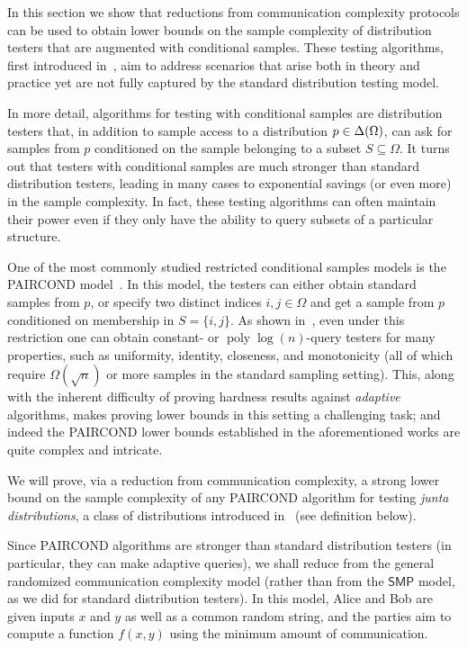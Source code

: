 \documentclass[11pt]{article}
\theoremstyle{remark}   	\newtheorem{remark}[theorem]{Remark}
\theoremstyle{definition}   	\newaliascnt{defn}{theorem}
\providecommand{\poly}{\operatorname*{poly}}
\newcommand{\PCOND}{{\sf PAIRCOND}\xspace}
\newcommand{\SMP}{\ensuremath{\mathsf{SMP}}}
\begin{document}
In this section we show that reductions from communication complexity protocols can be used to obtain lower bounds on the sample complexity of distribution testers that are augmented with conditional samples. These testing algorithms, first introduced in~\cite{CFGM:13,CRS:12}, aim to address scenarios that arise both in theory and practice yet are not fully captured by the standard distribution testing model.

In more detail, algorithms for testing with conditional samples are distribution testers that, in addition to sample access to a distribution $p\in\Delta\!\left(\Omega\right)$, can ask for samples from $p$ conditioned on the sample belonging to a subset $S \subseteq \Omega$. It turns out that testers with conditional samples are much stronger than standard distribution testers, leading in many cases to exponential savings (or even more) in the sample complexity. In fact, these testing algorithms can often maintain their power even if they only have the ability to query subsets of a particular structure. 

One of the most commonly studied restricted conditional samples models is the \PCOND model~\cite{CRS:12}. In this model, the testers can either obtain standard samples from $p$, or specify two distinct indices $i,j \in \Omega$ and get a sample from $p$ conditioned on membership in $S=\{i,j\}$. As shown in~\cite{CRS:12,Canonne:15:Survey}, even under this restriction one can obtain constant- or $\poly\log(n)$-query testers for many properties, such as uniformity, identity, closeness, and monotonicity (all of which require $\Omega(\sqrt{n})$ or more samples in the standard sampling setting). This, along with the inherent difficulty of proving hardness results against \emph{adaptive} algorithms, makes proving lower bounds in this setting a challenging task; and indeed the \PCOND lower bounds established in the aforementioned works are quite complex and intricate.


We will prove, via a reduction from communication complexity, a strong lower bound on the sample complexity of any \PCOND algorithm for testing \emph{junta distributions}, a class of distributions introduced in~\cite{ABR:16} (see definition below).

Since \PCOND algorithms are stronger than standard distribution testers (in particular, they can make {adaptive} queries), we shall reduce from the general randomized communication complexity model (rather than from the $\SMP$ model, as we did for standard distribution testers). In this model, Alice and Bob are given inputs $x$ and $y$ as well as a common random string, and the parties aim to compute a function $f(x,y)$ using the minimum amount of communication. 
\end{document}
